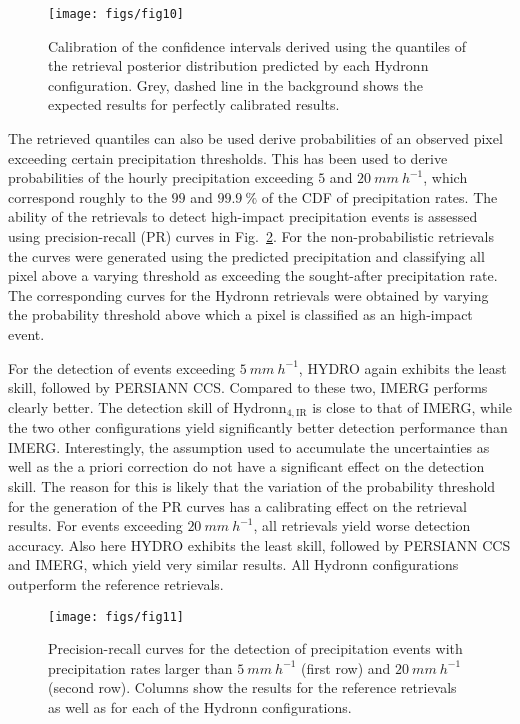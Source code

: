 \documentclass[journal abbreviation, manuscript]{copernicus}
\newcommand{\hydronnfourir}{Hydronn$_{4, \text{IR}}$}
\begin{document}
\begin{figure}
  \centering
  \texttt{[image: figs/fig10]}
  \caption{
    Calibration of the confidence intervals derived using the quantiles
    of the retrieval posterior distribution predicted by each Hydronn
    configuration. Grey, dashed line in the background shows the expected
    results for perfectly calibrated results.
    }
  \label{fig:calibration}
\end{figure}


The retrieved quantiles can also be used derive probabilities of an observed
pixel exceeding certain precipitation thresholds. This has been used to derive
probabilities of the hourly precipitation exceeding $5$ and
$20\ \unit{mm\ h^{-1}}$, which correspond roughly to the $99$ and
$99.9\ \unit{\%}$ of the CDF of precipitation rates. The ability of the
retrievals to detect high-impact precipitation events is assessed using
precision-recall (PR) curves in Fig.~\ref{fig:pr_curves}. For the
non-probabilistic retrievals the curves were generated using the predicted
precipitation and classifying all pixel above a varying threshold as exceeding
the sought-after precipitation rate. The corresponding curves for the Hydronn
retrievals were obtained by varying the probability threshold above which a
pixel is classified as an high-impact event.

For the detection of events exceeding $5\ \unit{mm\ h^{-1}}$, HYDRO again
exhibits the least skill, followed by PERSIANN CCS. Compared to these two, IMERG
performs clearly better. The detection skill of \hydronnfourir{} is close to
that of IMERG, while the two other configurations yield significantly better
detection performance than IMERG. Interestingly, the assumption used to
accumulate the uncertainties as well as the a priori correction do not have
a significant effect on the detection skill. The reason for this is likely that
the variation of the probability threshold for the generation of the PR curves
has a calibrating effect on the retrieval results. For events exceeding $20\ \unit{mm\ h^{-1}}$,
all retrievals yield worse detection accuracy. Also here HYDRO exhibits the
least skill, followed by PERSIANN CCS and IMERG, which yield very similar
results. All Hydronn configurations outperform the reference retrievals.

\begin{figure}
  \centering
  \texttt{[image: figs/fig11]}
  \caption{
    Precision-recall  curves for the detection of precipitation events with
    precipitation rates larger than $5\ \unit{mm\ h^{-1}}$ (first row) and
    $20\ \unit{mm\ h^{-1}}$ (second row). Columns show the results for the
    reference retrievals as well as for each of the Hydronn configurations.
    }
  \label{fig:pr_curves}
\end{figure}
\end{document}
